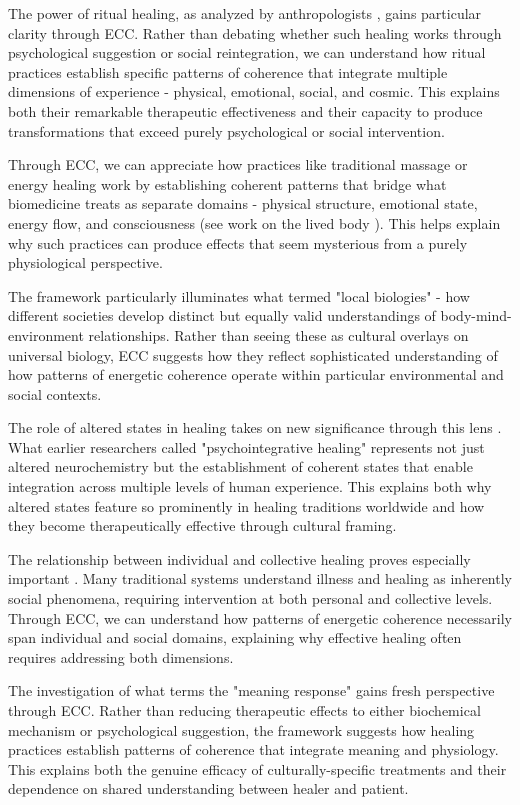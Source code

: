 The power of ritual healing, as analyzed by anthropologists \cite{turner1968drums}, gains particular clarity through ECC. Rather than debating whether such healing works through psychological suggestion or social reintegration, we can understand how ritual practices establish specific patterns of coherence that integrate multiple dimensions of experience - physical, emotional, social, and cosmic. This explains both their remarkable therapeutic effectiveness and their capacity to produce transformations that exceed purely psychological or social intervention.

Through ECC, we can appreciate how practices like traditional massage or energy healing work by establishing coherent patterns that bridge what biomedicine treats as separate domains - physical structure, emotional state, energy flow, and consciousness (see work on the lived body \cite{csordas1993somatic}). This helps explain why such practices can produce effects that seem mysterious from a purely physiological perspective.

The framework particularly illuminates what \cite{lock1993encounters} termed "local biologies" - how different societies develop distinct but equally valid understandings of body-mind-environment relationships. Rather than seeing these as cultural overlays on universal biology, ECC suggests how they reflect sophisticated understanding of how patterns of energetic coherence operate within particular environmental and social contexts.

The role of altered states in healing takes on new significance through this lens \cite{kapferer1991celebration}. What earlier researchers called "psychointegrative healing" represents not just altered neurochemistry but the establishment of coherent states that enable integration across multiple levels of human experience. This explains both why altered states feature so prominently in healing traditions worldwide and how they become therapeutically effective through cultural framing.

The relationship between individual and collective healing proves especially important \cite{kleinman1980patients}. Many traditional systems understand illness and healing as inherently social phenomena, requiring intervention at both personal and collective levels. Through ECC, we can understand how patterns of energetic coherence necessarily span individual and social domains, explaining why effective healing often requires addressing both dimensions.

The investigation of what \cite{moerman2002meaning} terms the "meaning response" gains fresh perspective through ECC. Rather than reducing therapeutic effects to either biochemical mechanism or psychological suggestion, the framework suggests how healing practices establish patterns of coherence that integrate meaning and physiology. This explains both the genuine efficacy of culturally-specific treatments and their dependence on shared understanding between healer and patient.

